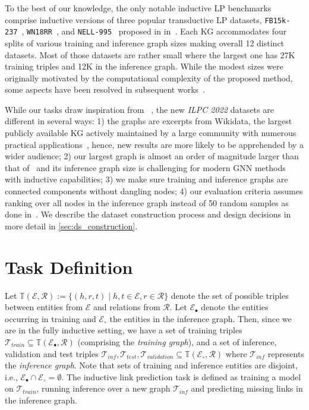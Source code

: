 \documentclass[sigconf,screen]{acmart}
\newcommand{\ilpc}{\textsl{\textsc{ILPC 2022}}\xspace}
\begin{document}
To the best of our knowledge, the only notable inductive LP benchmarks comprise inductive versions of three popular transductive LP datasets, \texttt{FB15k-237}~\cite{toutanova-chen-2015-observed}, \texttt{WN18RR}~\cite{DBLP:conf/aaai/DettmersMS018}, and \texttt{NELL-995}~\cite{chen2018variational} proposed in in~\cite{teru2020inductive}. 
Each KG accommodates four splits of various training and inference graph sizes making overall 12 distinct datasets.
Most of those datasets are rather small where the largest one has 27K training triples and 12K in the inference graph.
While the modest sizes were originally motivated by the computational complexity of the proposed method, some aspects have been resolved in subsequent works~\cite{zhu2021neural, galkin2022nodepiece}.

While our tasks draw inspiration from ~\cite{teru2020inductive}, the new \ilpc datasets are different in several ways: 1) the graphs are excerpts from Wikidata, the largest publicly available KG actively maintained by a large community with numerous practical applications~\cite{christmann2019look, decao2020autoregressive, decao2020multilingual}, hence, new results are more likely to be apprehended by a wider audience; 2) our largest graph is almost an order of magnitude larger than that of~\cite{teru2020inductive} and its inference graph size is challenging for modern GNN methods with inductive capabilities; 3) we make sure training and inference graphs are connected components without dangling nodes; 4) our evaluation criteria assumes ranking over all nodes in the inference graph instead of 50 random samples as done in~\cite{teru2020inductive}.
We describe the dataset construction process and design decisions in more detail in \cref{sec:ds_construction}.




\section{Task Definition}

Let
$
\mathbb{T}(\mathcal{E}, \mathcal{R}) := \{
(h, r, t) \mid h,t \in \mathcal{E}, r \in \mathcal{R}
\}
$
denote the set of possible triples between entities from $\mathcal{E}$ and relations from $\mathcal{R}$.
Let $\mathcal{E}_{\bullet}$ denote the entities occurring in training and $\mathcal{E}_{\circ}$ the entities in the inference graph.
Then, since we are in the fully inductive setting, we have a set of training triples $\mathcal{T}_{train} \subseteq \mathbb{T}(\mathcal{E}_{\bullet}, \mathcal{R})$ (comprising the \emph{training graph}), and a set of inference, validation and test triples 
$\mathcal{T}_{inf}, \mathcal{T}_{test}, \mathcal{T}_{validation} \subseteq \mathbb{T}(\mathcal{E}_{\circ}, \mathcal{R})$ where $\mathcal{T}_{inf}$ represents the \emph{inference graph}. 
Note that sets of training and inference entities are disjoint, i.e., $\mathcal{E}_{\bullet} \cap \mathcal{E}_{\circ} = \emptyset$.
The inductive link prediction task is defined as training a model on $\mathcal{T}_{train}$, running inference over a new graph $\mathcal{T}_{inf}$ and predicting missing links in the inference graph.
\end{document}
